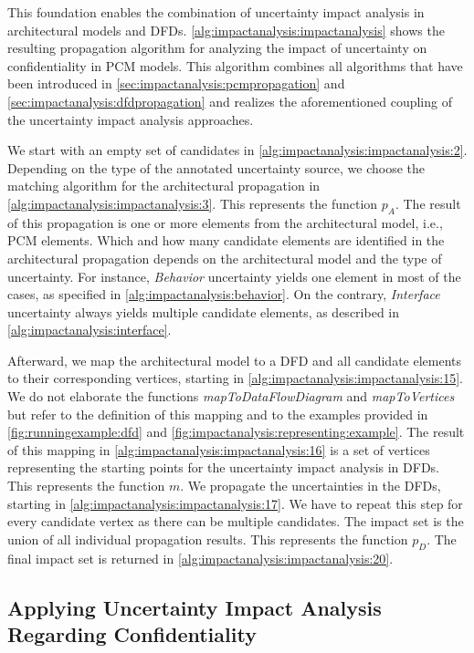 This foundation enables the combination of uncertainty impact analysis in architectural models and \acp{DFD}.
\autoref{alg:impactanalysis:impactanalysis} shows the resulting propagation algorithm for analyzing the impact of uncertainty on confidentiality in \ac{PCM} models.
This algorithm combines all algorithms that have been introduced in \autoref{sec:impactanalysis:pcmpropagation} and \autoref{sec:impactanalysis:dfdpropagation} and realizes the aforementioned coupling of the uncertainty impact analysis approaches.

We start with an empty set of candidates in \autoref{alg:impactanalysis:impactanalysis:2}.
Depending on the type of the annotated uncertainty source, we choose the matching algorithm for the architectural propagation in \autoref{alg:impactanalysis:impactanalysis:3}.
This represents the function $p_{A}$.
The result of this propagation is one or more elements from the architectural model, i.e., \ac{PCM} elements.
Which and how many candidate elements are identified in the architectural propagation depends on the architectural model and the type of uncertainty.
For instance, \emph{Behavior} uncertainty yields one element in most of the cases, as specified in \autoref{alg:impactanalysis:behavior}.
On the contrary, \emph{Interface} uncertainty always yields multiple candidate elements, as described in \autoref{alg:impactanalysis:interface}.

Afterward, we map the architectural model to a \ac{DFD} and all candidate elements to their corresponding vertices, starting in \autoref{alg:impactanalysis:impactanalysis:15}.
We do not elaborate the functions \emph{mapToDataFlowDiagram} and \emph{mapToVertices} but refer to the definition of this mapping \cite{seifermann_data-driven_2019,seifermann_architectural_2022} and to the examples provided in \autoref{fig:runningexample:dfd} and \autoref{fig:impactanalysis:representing:example}.
The result of this mapping in \autoref{alg:impactanalysis:impactanalysis:16} is a set of vertices representing the starting points for the uncertainty impact analysis in \acp{DFD}.
This represents the function $m$.
We propagate the uncertainties in the \acp{DFD}, starting in \autoref{alg:impactanalysis:impactanalysis:17}.
We have to repeat this step for every candidate vertex as there can be multiple candidates.
The impact set is the union of all individual propagation results.
This represents the function $p_{D}$.
The final impact set is returned in \autoref{alg:impactanalysis:impactanalysis:20}.


\subsection{Applying Uncertainty Impact Analysis Regarding Confidentiality}

